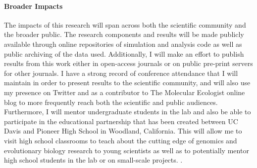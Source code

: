 \paragraph{Broader Impacts}

The impacts of this research will span across both the scientific community and the broader public. The research components and results will be made publicly available  through online repositories of simulation and analysis code as well as public archiving of the data used. Additionally, I will make an effort to publish results from this work either in open-access journals %
or on public pre-print servers for other journals. I have a strong record of conference attendance that I will maintain in order to present results to the scientific community, and will also use my presence on Twitter and as a contributor to The Molecular Ecologist online blog to more frequently reach both the scientific and public audiences. Furthermore, I will mentor undergraduate students in the lab and also be able to participate in the educational partnership that has been created between UC Davis and Pioneer High School in Woodland, California. This will allow me to visit high school classrooms to teach about the cutting edge of genomics and evolutionary biology research to young scientists as well as to potentially mentor high school students in the lab or on small-scale projects. .%

